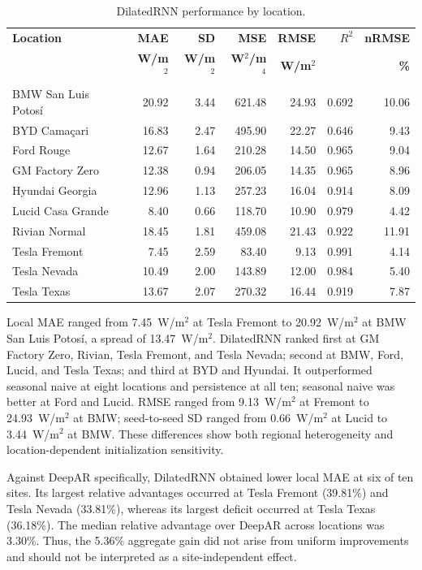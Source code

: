 \documentclass[runningheads]{llncs}
\begin{document}
\begin{table}[t]
\caption{DilatedRNN performance by location.}
\label{tab:local}
\centering
\scriptsize
\setlength{\tabcolsep}{2.7pt}
\begin{tabular}{@{}>{\raggedright\arraybackslash}p{3.05cm}rrrrrr@{}}
\toprule
\textbf{Location} & \textbf{MAE} & \textbf{SD} & \textbf{MSE} & \textbf{RMSE} & \textbf{$R^2$} & \textbf{nRMSE} \\
 & \textbf{W/m$^2$} & \textbf{W/m$^2$} & \textbf{W$^2$/m$^4$} & \textbf{W/m$^2$} & & \textbf{\%} \\
\midrule
BMW San Luis Potosí & 20.92 & 3.44 & 621.48 & 24.93 & 0.692 & 10.06 \\
BYD Camaçari        & 16.83 & 2.47 & 495.90 & 22.27 & 0.646 & 9.43 \\
Ford Rouge          & 12.67 & 1.64 & 210.28 & 14.50 & 0.965 & 9.04 \\
GM Factory Zero     & 12.38 & 0.94 & 206.05 & 14.35 & 0.965 & 8.96 \\
Hyundai Georgia     & 12.96 & 1.13 & 257.23 & 16.04 & 0.914 & 8.09 \\
Lucid Casa Grande   & 8.40  & 0.66 & 118.70 & 10.90 & 0.979 & 4.42 \\
Rivian Normal       & 18.45 & 1.81 & 459.08 & 21.43 & 0.922 & 11.91 \\
Tesla Fremont       & 7.45  & 2.59 & 83.40  & 9.13  & 0.991 & 4.14 \\
Tesla Nevada        & 10.49 & 2.00 & 143.89 & 12.00 & 0.984 & 5.40 \\
Tesla Texas         & 13.67 & 2.07 & 270.32 & 16.44 & 0.919 & 7.87 \\
\bottomrule
\end{tabular}
\end{table}

Local MAE ranged from 7.45~W/m$^2$ at Tesla Fremont to 20.92~W/m$^2$ at BMW San Luis Potosí, a spread of 13.47~W/m$^2$. DilatedRNN ranked first at GM Factory Zero, Rivian, Tesla Fremont, and Tesla Nevada; second at BMW, Ford, Lucid, and Tesla Texas; and third at BYD and Hyundai. It outperformed seasonal naive at eight locations and persistence at all ten; seasonal naive was better at Ford and Lucid. RMSE ranged from 9.13~W/m$^2$ at Fremont to 24.93~W/m$^2$ at BMW; seed-to-seed SD ranged from 0.66~W/m$^2$ at Lucid to 3.44~W/m$^2$ at BMW. These differences show both regional heterogeneity and location-dependent initialization sensitivity.

Against DeepAR specifically, DilatedRNN obtained lower local MAE at six of ten sites. Its largest relative advantages occurred at Tesla Fremont (39.81\%) and Tesla Nevada (33.81\%), whereas its largest deficit occurred at Tesla Texas (36.18\%). The median relative advantage over DeepAR across locations was 3.30\%. Thus, the 5.36\% aggregate gain did not arise from uniform improvements and should not be interpreted as a site-independent effect.
\end{document}
